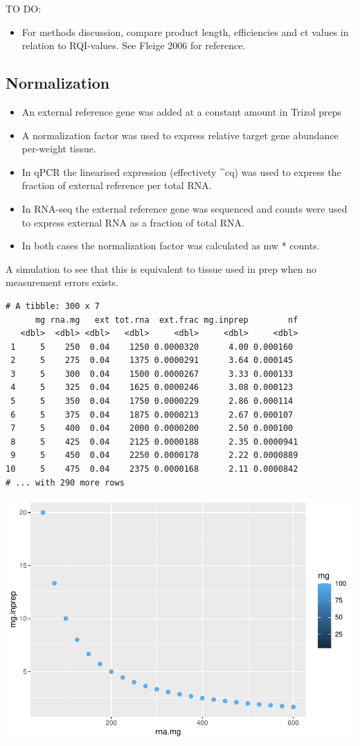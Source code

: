 \documentclass[twoside,10pt]{gihclass} %
\providecommand{\tightlist}{%
  \setlength{\itemsep}{0pt}\setlength{\parskip}{0pt}}
\begin{document}
TO DO:
\begin{itemize}
\tightlist
\item
  For methods discussion, compare product length, efficiencies and ct
  values in relation to RQI-values. See Fleige 2006 for reference.
\end{itemize}
\hypertarget{normalization}{%
\subsection{Normalization}\label{normalization}}
\begin{itemize}
\tightlist
\item
  An external reference gene was added at a constant amount in Trizol
  preps
\item
  A normalization factor was used to express relative target gene
  abundance per-weight tissue.
\item
  In qPCR the linearised expression (effectivety \^{}cq) was used to
  express the fraction of external reference per total RNA.
\item
  In RNA-seq the external reference gene was sequenced and counts were
  used to express external RNA as a fraction of total RNA.
\item
  In both cases the normalization factor was calculated as mw *
  counts.
\end{itemize}
A simulation to see that this is equivalent to tissue used in prep when
no measurement errors exists.
\begin{verbatim}
# A tibble: 300 x 7
      mg rna.mg   ext tot.rna  ext.frac mg.inprep        nf
   <dbl>  <dbl> <dbl>   <dbl>     <dbl>     <dbl>     <dbl>
 1     5    250  0.04    1250 0.0000320      4.00 0.000160 
 2     5    275  0.04    1375 0.0000291      3.64 0.000145 
 3     5    300  0.04    1500 0.0000267      3.33 0.000133 
 4     5    325  0.04    1625 0.0000246      3.08 0.000123 
 5     5    350  0.04    1750 0.0000229      2.86 0.000114 
 6     5    375  0.04    1875 0.0000213      2.67 0.000107 
 7     5    400  0.04    2000 0.0000200      2.50 0.000100 
 8     5    425  0.04    2125 0.0000188      2.35 0.0000941
 9     5    450  0.04    2250 0.0000178      2.22 0.0000889
10     5    475  0.04    2375 0.0000168      2.11 0.0000842
# ... with 290 more rows
\end{verbatim}
\includegraphics{thesis_files/figure-latex/unnamed-chunk-1-1.pdf}
\end{document}
